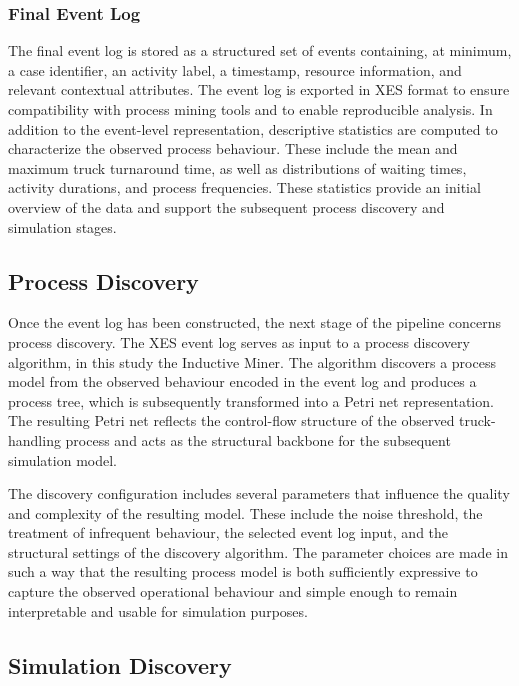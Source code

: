 \subsubsection{Final Event Log}

The final event log is stored as a structured set of events containing, at minimum, a case identifier, an activity label, a timestamp, resource information, and relevant contextual attributes. The event log is exported in XES format to ensure compatibility with process mining tools and to enable reproducible analysis. In addition to the event-level representation, descriptive statistics are computed to characterize the observed process behaviour. These include the mean and maximum truck turnaround time, as well as distributions of waiting times, activity durations, and process frequencies. These statistics provide an initial overview of the data and support the subsequent process discovery and simulation stages.

\subsection{Process Discovery}

Once the event log has been constructed, the next stage of the pipeline concerns process discovery. The XES event log serves as input to a process discovery algorithm, in this study the Inductive Miner. The algorithm discovers a process model from the observed behaviour encoded in the event log and produces a process tree, which is subsequently transformed into a Petri net representation. The resulting Petri net reflects the control-flow structure of the observed truck-handling process and acts as the structural backbone for the subsequent simulation model.

The discovery configuration includes several parameters that influence the quality and complexity of the resulting model. These include the noise threshold, the treatment of infrequent behaviour, the selected event log input, and the structural settings of the discovery algorithm. The parameter choices are made in such a way that the resulting process model is both sufficiently expressive to capture the observed operational behaviour and simple enough to remain interpretable and usable for simulation purposes.

\subsection{Simulation Discovery}

